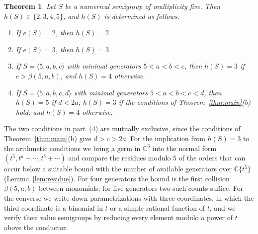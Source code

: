 \documentclass{amsart}
\newtheorem{theorem}{Theorem}[section]
\theoremstyle{definition}
\theoremstyle{remark}
\numberwithin{equation}{section}
\newcommand{\C}{\mathbb{C}}
\newcommand{\gen}[1]{\langle #1\rangle}
\begin{document}
\begin{theorem}\label{thm:all}
Let $S$ be a numerical semigroup of multiplicity five. Then $h(S)\in\{2,3,4,5\}$, and $h(S)$ is determined as follows.
\begin{enumerate}
\item If $e(S)=2$, then $h(S)=2$.
\item If $e(S)=3$, then $h(S)=3$.
\item If $S=\gen{5,a,b,c}$ with minimal generators $5<a<b<c$, then $h(S)=3$ if $c>\beta(5,a,b)$, and $h(S)=4$ otherwise.
\item If $S=\gen{5,a,b,c,d}$ with minimal generators $5<a<b<c<d$, then $h(S)=5$ if $d<2a$; $h(S)=3$ if the conditions of Theorem~\textup{\ref{thm:main}(b)} hold; and $h(S)=4$ otherwise.
\end{enumerate}
\end{theorem}

The two conditions in part~(4) are mutually exclusive, since the conditions of Theorem~\ref{thm:main}(b) give $d>c>2a$. For the implication from $h(S)=3$ to the arithmetic conditions we bring a germ in $\C^3$ into the normal form $(t^5,t^a+\cdots,t^b+\cdots)$ and compare the residues modulo $5$ of the orders that can occur below a suitable bound with the number of available generators over $\C\{t^5\}$ (Lemma~\ref{lem:residue}). For four generators the bound is the first collision $\beta(5,a,b)$ between monomials; for five generators two such counts suffice. For the converse we write down parametrizations with three coordinates, in which the third coordinate is a binomial in $t$ or a simple rational function of $t$, and we verify their value semigroups by reducing every element modulo a power of $t$ above the conductor.
\end{document}
